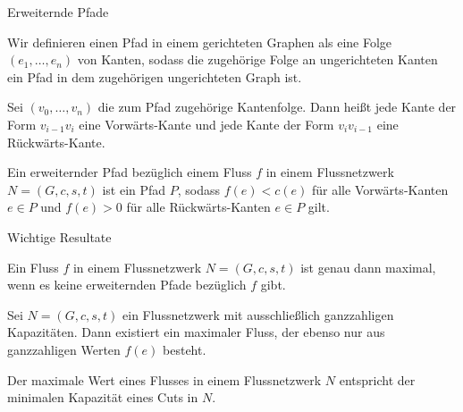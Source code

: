 \documentclass[aspectratio=169]{beamer}
\begin{document}
  \begin{frame}{Erweiternde Pfade}

  \begin{definition*}[Pfad]
    Wir definieren einen Pfad in einem gerichteten Graphen als eine Folge
    $(e_1,\dots,e_n)$ von Kanten, sodass die zugehörige Folge an ungerichteten
    Kanten ein Pfad in dem zugehörigen ungerichteten Graph ist.
    \pause


    Sei $(v_0,\dots,v_n)$ die zum Pfad zugehörige Kantenfolge.
    Dann heißt jede Kante der Form $v_{i-1}v_{i}$ eine Vorwärts-Kante
    und jede Kante der Form $v_{i}v_{i-1}$ eine Rückwärts-Kante.

  \end{definition*}

  \pause

  \begin{definition*}
    Ein erweiternder Pfad bezüglich einem Fluss $f$ in einem Flussnetzwerk
    $N = (G,c,s,t)$ ist ein Pfad $P$,
    sodass $f(e) < c(e)$ für alle Vorwärts-Kanten $e \in P$ und $f(e) > 0$
    für alle Rückwärts-Kanten $e \in P$ gilt.
  \end{definition*}

  \end{frame}

  \begin{frame}{Wichtige Resultate}

  \begin{theorem*}
    Ein Fluss $f$ in einem Flussnetzwerk $N = (G,c,s,t)$ ist genau dann maximal,
    wenn es keine erweiternden Pfade bezüglich $f$ gibt.
  \end{theorem*}

  \pause

  \begin{theorem*}
    Sei $N = (G,c,s,t)$ ein Flussnetzwerk mit ausschließlich ganzzahligen Kapazitäten.
    Dann existiert ein maximaler Fluss, der ebenso nur aus ganzzahligen Werten $f(e)$
    besteht.
  \end{theorem*}

  \pause

  \begin{theorem*}
    Der maximale Wert eines Flusses in einem Flussnetzwerk $N$ entspricht
    der minimalen Kapazität eines Cuts in $N$.
  \end{theorem*}

  \end{frame}
\end{document}
